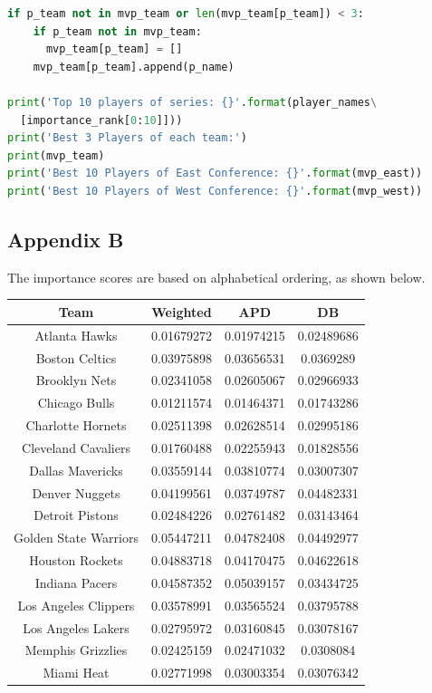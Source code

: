 \documentclass[12pt]{article}%
\begin{document}
\begin{lstlisting}[language=Python]
  if p_team not in mvp_team or len(mvp_team[p_team]) < 3:
    if p_team not in mvp_team:
      mvp_team[p_team] = []
    mvp_team[p_team].append(p_name)

print('Top 10 players of series: {}'.format(player_names\
  [importance_rank[0:10]]))
print('Best 3 Players of each team:')
print(mvp_team)
print('Best 10 Players of East Conference: {}'.format(mvp_east))
print('Best 10 Players of West Conference: {}'.format(mvp_west))

\end{lstlisting}
\newpage
\subsection{Appendix B}
The importance scores are based on alphabetical ordering, as shown below.
\begin{center}
\begin{tabular}{|c|c|c|c|}
\hline
\textbf{Team} &\textbf{Weighted}&\textbf{APD} &\textbf{DB}\\\hline
Atlanta Hawks & 0.01679272 & 0.01974215 & 0.02489686\\
Boston Celtics & 0.03975898 &0.03656531 &0.0369289 \\
Brooklyn Nets & 0.02341058 &0.02605067 &0.02966933\\
Chicago Bulls& 0.01211574 &0.01464371 &0.01743286\\
Charlotte Hornets &0.02511398 &0.02628514 &0.02995186\\
Cleveland Cavaliers&0.01760488 &0.02255943 &0.01828556\\
Dallas Mavericks&0.03559144 &0.03810774 & 0.03007307\\
Denver Nuggets&0.04199561 &0.03749787 &0.04482331\\
Detroit Pistons &0.02484226 &0.02761482 &0.03143464\\
Golden State Warriors&0.05447211 &0.04782408 &0.04492977\\
Houston Rockets&0.04883718 &0.04170475 &0.04622618\\
Indiana Pacers&0.04587352 &0.05039157 &0.03434725\\
Los Angeles Clippers&0.03578991 &0.03565524 &0.03795788\\
Los Angeles Lakers&0.02795972 &0.03160845 &0.03078167\\
Memphis Grizzlies&0.02425159 &0.02471032 &0.0308084 \\
Miami Heat&0.02771998 &0.03003354 &0.03076342\\

\end{tabular}
\end{center}
\end{document}
